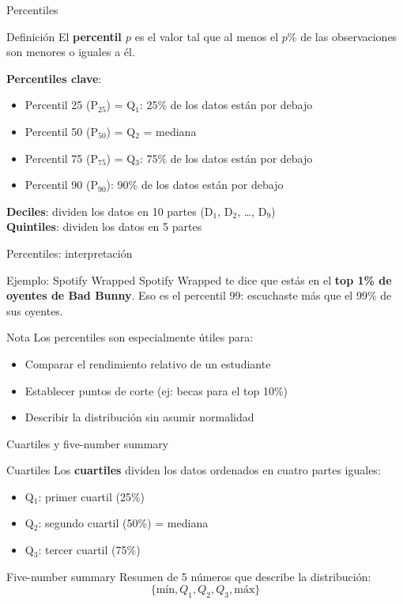 \documentclass[aspectratio=169, 11pt]{beamer}
\begin{document}
\begin{frame}{Percentiles}
\begin{block}{Definición}
El \textbf{percentil $p$} es el valor tal que al menos el $p\%$ de las observaciones son menores o iguales a él.
\end{block}

\textbf{Percentiles clave}:
\begin{itemize}
\item Percentil 25 (P$_{25}$) = Q$_1$: 25\% de los datos están por debajo
\item Percentil 50 (P$_{50}$) = Q$_2$ = mediana
\item Percentil 75 (P$_{75}$) = Q$_3$: 75\% de los datos están por debajo
\item Percentil 90 (P$_{90}$): 90\% de los datos están por debajo
\end{itemize}

\vspace{0.5em}
\textbf{Deciles}: dividen los datos en 10 partes (D$_1$, D$_2$, \ldots, D$_9$)\\
\textbf{Quintiles}: dividen los datos en 5 partes
\end{frame}

\begin{frame}{Percentiles: interpretación}
\begin{exampleblock}{Ejemplo: Spotify Wrapped}
Spotify Wrapped te dice que est\'as en el \textbf{top 1\% de oyentes de Bad Bunny}. Eso es el percentil 99: escuchaste m\'as que el 99\% de sus oyentes.
\end{exampleblock}

\vspace{1em}
\begin{alertblock}{Nota}
Los percentiles son especialmente útiles para:
\begin{itemize}
\item Comparar el rendimiento relativo de un estudiante
\item Establecer puntos de corte (ej: becas para el top 10\%)
\item Describir la distribución sin asumir normalidad
\end{itemize}
\end{alertblock}
\end{frame}

\begin{frame}{Cuartiles y five-number summary}
\begin{block}{Cuartiles}
Los \textbf{cuartiles} dividen los datos ordenados en cuatro partes iguales:
\begin{itemize}
\item Q$_1$: primer cuartil (25\%)
\item Q$_2$: segundo cuartil (50\%) = mediana
\item Q$_3$: tercer cuartil (75\%)
\end{itemize}
\end{block}

\begin{block}{Five-number summary}
Resumen de 5 números que describe la distribución:
\[
\{\text{mín}, Q_1, Q_2, Q_3, \text{máx}\}
\]
\end{block}
\end{frame}
\end{document}
